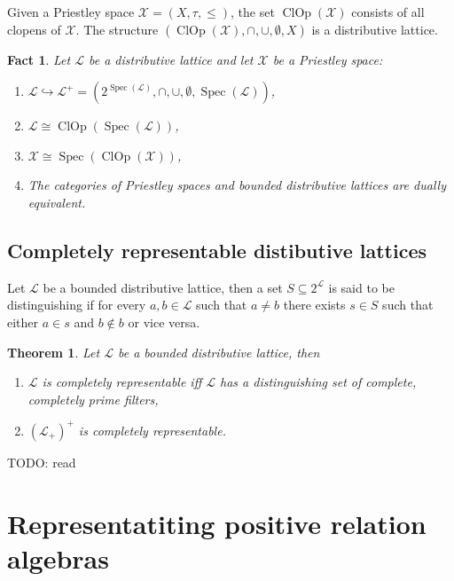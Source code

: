\documentclass[a4paper]{article}
\theoremstyle{defin}
\theoremstyle{theorem}
\newtheorem{theorem}{Theorem}
\theoremstyle{claim}
\theoremstyle{prop}
\theoremstyle{lemma}
\theoremstyle{fact}
\newtheorem{fact}{Fact}
\theoremstyle{ex}
\theoremstyle{col}
\begin{document}
Given a Priestley space $\mathcal{X} = (X, \tau, \leq)$, the set $\operatorname{ClOp}(\mathcal{X})$ consists of all clopens of $\mathcal{X}$. The structure $(\operatorname{ClOp}(\mathcal{X}), \cap, \cup, \emptyset, X)$ is a distributive lattice.

\begin{fact} Let $\mathcal{L}$ be a distributive lattice and let $\mathcal{X}$ be a Priestley space:

\begin{enumerate}
\item $\mathcal{L} \hookrightarrow \mathcal{L}^{+} = (2^{\operatorname{Spec}(\mathcal{L})}, \cap, \cup, \emptyset, \operatorname{Spec}(\mathcal{L}))$,
\item $\mathcal{L} \cong \operatorname{ClOp}(\operatorname{Spec}(\mathcal{L}))$,
\item $\mathcal{X} \cong \operatorname{Spec}(\operatorname{ClOp}(\mathcal{X}))$,
\item The categories of Priestley spaces and bounded distributive lattices are dually equivalent.
\end{enumerate}
\end{fact}

\subsection{Completely representable distibutive lattices}

Let $\mathcal{L}$ be a bounded distributive lattice, then a set $S \subseteq 2^{\mathcal{L}}$ is said to be distinguishing if for every $a, b \in \mathcal{L}$ such that $a \neq b$ there exists $s \in S$ such that either $a \in s$ and $b \notin b$ or vice versa.

\begin{theorem} Let $\mathcal{L}$ be a bounded distributive lattice, then

\begin{enumerate}
\item $\mathcal{L}$ is completely representable iff $\mathcal{L}$ has a distinguishing set of complete, completely prime filters,
\item $(\mathcal{L}_+)^{+}$ is completely representable.
\end{enumerate}
\end{theorem}

TODO: read \cite{egrot2012completely}

\section{Representatiting positive relation algebras}
\end{document}
